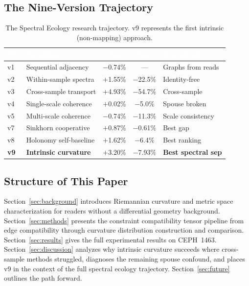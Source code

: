 \documentclass{../yalumba}
\begin{document}
\subsection{The Nine-Version Trajectory}

\begin{table}[H]
  \centering
  \tablestyle
  \caption{The Spectral Ecology research trajectory.  v9 represents the
    first intrinsic (non-mapping) approach.}
  \label{tab:trajectory}
  \begin{tabular}{llccl}
    \toprule
    \rowcolor{table-header}
    \textcolor{white}{\textbf{Ver}} &
    \textcolor{white}{\textbf{Paradigm}} &
    \textcolor{white}{\textbf{Sep}} &
    \textcolor{white}{\textbf{Gap}} &
    \textcolor{white}{\textbf{Key advance}} \\
    \midrule
    v1 & Sequential adjacency & $-$0.74\% & --- & Graphs from reads \\
    v2 & Within-sample spectra & $+$1.55\% & $-$22.5\% & Identity-free \\
    v3 & Cross-sample transport & $+$4.93\% & $-$54.7\% & Cross-sample \\
    v4 & Single-scale coherence & $+$0.02\% & $-$5.0\% & Spouse broken \\
    v5 & Multi-scale coherence & $-$0.74\% & $-$11.3\% & Scale consistency \\
    v7 & Sinkhorn cooperative & $+$0.87\% & $-$0.61\% & Best gap \\
    v8 & Holonomy self-baseline & $+$1.62\% & $-$6.4\% & Best ranking \\
    \textbf{v9} & \textbf{Intrinsic curvature} & $\mathbf{+3.20\%}$ &
      $-$7.93\% & \textbf{Best spectral sep} \\
    \bottomrule
  \end{tabular}
\end{table}

\subsection{Structure of This Paper}

Section~\ref{sec:background} introduces Riemannian curvature and metric
space characterization for readers without a differential geometry background.
Section~\ref{sec:methods} presents the constraint compatibility tensor
pipeline from edge compatibility through curvature distribution construction
and comparison.  Section~\ref{sec:results} gives the full experimental
results on CEPH~1463.  Section~\ref{sec:discussion} analyzes why intrinsic
curvature succeeds where cross-sample methods struggled, diagnoses the
remaining spouse confound, and places v9 in the context of the full spectral
ecology trajectory.  Section~\ref{sec:future} outlines the path forward.
\end{document}
